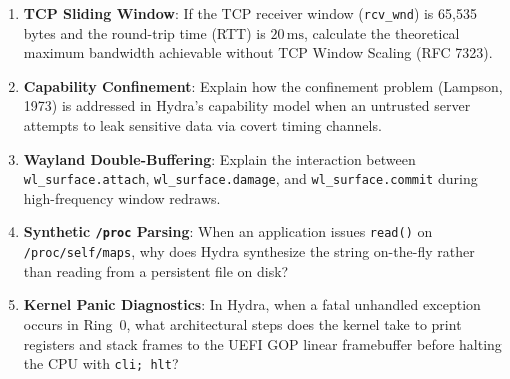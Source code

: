 \begin{enumerate}
    \item \textbf{TCP Sliding Window}: If the TCP receiver window (\texttt{rcv\_wnd}) is 65,535 bytes and the round-trip time (RTT) is $20\,\text{ms}$, calculate the theoretical maximum bandwidth achievable without TCP Window Scaling (RFC 7323).
    \item \textbf{Capability Confinement}: Explain how the confinement problem (Lampson, 1973) is addressed in Hydra's capability model when an untrusted server attempts to leak sensitive data via covert timing channels.
    \item \textbf{Wayland Double-Buffering}: Explain the interaction between \texttt{wl\_surface.attach}, \texttt{wl\_surface.damage}, and \texttt{wl\_surface.commit} during high-frequency window redraws.
    \item \textbf{Synthetic \texttt{/proc} Parsing}: When an application issues \texttt{read()} on \texttt{/proc/self/maps}, why does Hydra synthesize the string on-the-fly rather than reading from a persistent file on disk?
    \item \textbf{Kernel Panic Diagnostics}: In Hydra, when a fatal unhandled exception occurs in Ring~0, what architectural steps does the kernel take to print registers and stack frames to the UEFI GOP linear framebuffer before halting the CPU with \texttt{cli; hlt}?
\end{enumerate}
